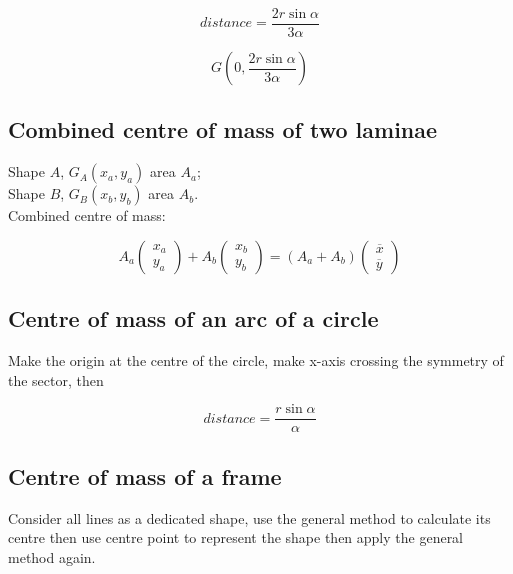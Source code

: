 \documentclass[a4paper,9pt]{scrartcl}
\begin{document}
    \begin{displaymath}
        distance = \frac{2r\sin\alpha}{3\alpha}
    \end{displaymath}

    \begin{displaymath}
        G\left( 0, \frac{2r\sin\alpha}{3\alpha} \right)
    \end{displaymath}

    \subsection{Combined centre of mass of two laminae}
    Shape $A$, $G_A(x_a, y_a)$ area $A_a$; \\
    Shape $B$, $G_B(x_b, y_b)$ area $A_b$. \\
    Combined centre of mass:

    \begin{displaymath}
        A_a\begin{pmatrix}
               x_a \\
               y_a
        \end{pmatrix} +A_b\begin{pmatrix}
                              x_b \\
                              y_b
        \end{pmatrix}=(A_a+A_b)\begin{pmatrix}
                                   \overline{x}\\
                                   \overline{y}
        \end{pmatrix}
    \end{displaymath}

    \subsection{Centre of mass of an arc of a circle}

    Make the origin at the centre of the circle, make x-axis crossing the symmetry of the sector, then

    \begin{displaymath}
        distance = \frac{r\sin\alpha}{\alpha}
    \end{displaymath}

    \subsection{Centre of mass of a frame}

    Consider all lines as a dedicated shape, use the general method to calculate its centre then use centre point to represent the shape then apply the general method again.
\end{document}
